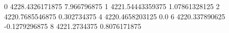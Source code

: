0 4228.4326171875 7.966796875
1 4221.54443359375 1.07861328125
2 4220.7685546875 0.302734375
4 4220.4658203125 0.0
6 4220.337890625 -0.1279296875
8 4221.2734375 0.8076171875
